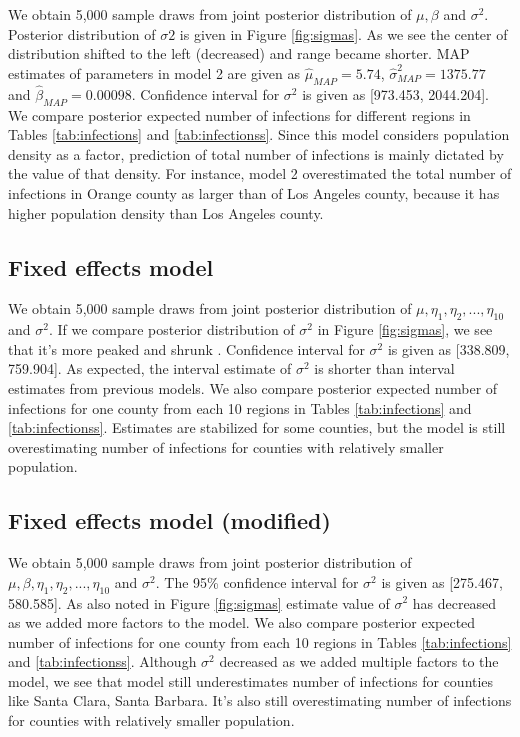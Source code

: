 \documentclass[11pt,twocolumn]{asaproc}
\begin{document}
We obtain 5,000 sample draws from joint posterior distribution of $\mu, \beta$ and $\sigma^2$. Posterior distribution of $\sigma2$ is given in Figure \ref{fig:sigmas}. As we see the center of distribution shifted to the left (decreased) and range became shorter. MAP estimates of parameters in model 2 are given as $\hat{\mu}_{MAP} = 5.74$, $\hat{\sigma}^2_{MAP} = 1375.77$ and $\hat{\beta}_{MAP} = 0.00098$. Confidence interval for $\sigma^2$ is given as [973.453, 2044.204]. We compare posterior expected number of infections for different regions in Tables \ref{tab:infections} and \ref{tab:infectionss}. Since this model considers population density as a factor, prediction of total number of infections is mainly dictated by the value of that density. For instance, model 2 overestimated the total number of infections in Orange county as larger than of Los Angeles county, because it has higher population density than Los Angeles county.




\subsection{Fixed effects model}

We obtain 5,000 sample draws from joint posterior distribution of $\mu, \eta_1, \eta_2, ..., \eta_{10}$ and $\sigma^2$. If we compare posterior distribution of $\sigma^2$ in Figure \ref{fig:sigmas}, we see that it's more peaked and shrunk . Confidence interval for $\sigma^2$ is given as [338.809, 759.904].  As expected, the interval estimate of $\sigma^2$ is shorter than interval estimates from previous models. We also compare posterior expected number of infections for one county from each 10 regions in Tables \ref{tab:infections} and \ref{tab:infectionss}. Estimates are stabilized for some counties, but the model is still overestimating number of infections for counties with relatively smaller population. 




\subsection{Fixed effects model (modified)}

We obtain 5,000 sample draws from  joint posterior distribution of $\mu, \beta, \eta_1, \eta_2, ..., \eta_{10}$ and $\sigma^2$. The 95\% confidence interval for $\sigma^2$ is given as [275.467, 580.585]. As also noted in Figure \ref{fig:sigmas} estimate value of $\sigma^2$ has decreased as we added more factors to the model. We also compare posterior expected number of infections for one county from each 10 regions in Tables \ref{tab:infections} and \ref{tab:infectionss}.  Although $\sigma^2$ decreased as we added multiple factors to the model, we see that model still underestimates number of infections for counties like Santa Clara, Santa Barbara. It's also still overestimating number of infections for counties with relatively smaller population. 
\end{document}
